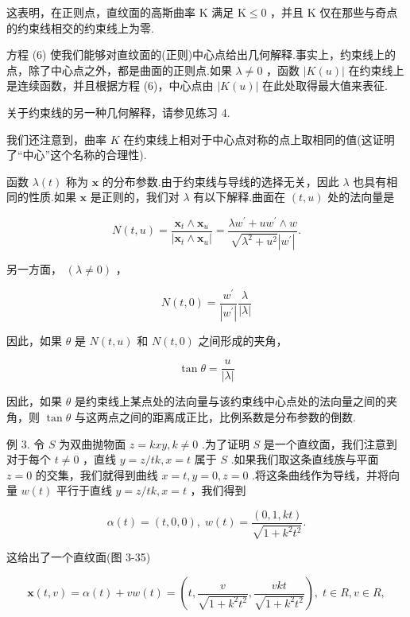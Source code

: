 这表明，在正则点，直纹面的高斯曲率 K 满足 \(\mathrm{K} \leq  0\) ，并且 \(\mathrm{K}\) 仅在那些与奇点的约束线相交的约束线上为零.

方程 (6) 使我们能够对直纹面的(正则)中心点给出几何解释.事实上，约束线上的点，除了中心点之外，都是曲面的正则点.如果 \(\lambda  \neq  0\) ，函数 \(\left| {K\left( u\right) }\right|\) 在约束线上是连续函数，并且根据方程 (6)，中心点由 \(\left| {K\left( u\right) }\right|\) 在此处取得最大值来表征.

关于约束线的另一种几何解释，请参见练习 4.

我们还注意到，曲率 \(K\) 在约束线上相对于中心点对称的点上取相同的值(这证明了“中心”这个名称的合理性).

函数 \(\lambda \left( t\right)\) 称为 \(\mathbf{x}\) 的分布参数.由于约束线与导线的选择无关，因此 \(\lambda\) 也具有相同的性质.如果 \(\mathbf{x}\) 是正则的，我们对 \(\lambda\) 有以下解释.曲面在 \(\left( {t,u}\right)\) 处的法向量是

\[
N\left( {t,u}\right)  = \frac{{\mathbf{x}}_{t} \land  {\mathbf{x}}_{u}}{\left| {\mathbf{x}}_{t} \land  {\mathbf{x}}_{u}\right| } = \frac{\lambda {w}^{\prime } + u{w}^{\prime } \land  w}{\sqrt{{\lambda }^{2} + {u}^{2}}\left| {w}^{\prime }\right| }.
\]

另一方面， \(\left( {\lambda  \neq  0}\right)\) ，

\[
N\left( {t,0}\right)  = \frac{{w}^{\prime }}{\left| {w}^{\prime }\right| }\frac{\lambda }{\left| \lambda \right| }
\]

因此，如果 \(\theta\) 是 \(N\left( {t,u}\right)\) 和 \(N\left( {t,0}\right)\) 之间形成的夹角，

\[
\tan \theta  = \frac{u}{\left| \lambda \right| } \tag{7}
\]

因此，如果 \(\theta\) 是约束线上某点处的法向量与该约束线中心点处的法向量之间的夹角，则 \(\tan \theta\) 与这两点之间的距离成正比，比例系数是分布参数的倒数.

例 3. 令 \(S\) 为双曲抛物面 \(z = {kxy},k \neq  0\) .为了证明 \(S\) 是一个直纹面，我们注意到对于每个 \(t \neq  0\) ，直线 \(y = z/{tk},x = t\) 属于 \(S\) .如果我们取这条直线族与平面 \(z = 0\) 的交集，我们就得到曲线 \(x = t,y = 0,z = 0\) .将这条曲线作为导线，并将向量 \(w\left( t\right)\) 平行于直线 \(y = z/{tk},x = t\) ，我们得到

\[
\alpha \left( t\right)  = \left( {t,0,0}\right) ,\;w\left( t\right)  = \frac{\left( 0,1,kt\right) }{\sqrt{1 + {k}^{2}{t}^{2}}}.
\]

这给出了一个直纹面(图 3-35)

\[
\mathbf{x}\left( {t,v}\right)  = \alpha \left( t\right)  + {vw}\left( t\right)  = \left( {t,\frac{v}{\sqrt{1 + {k}^{2}{t}^{2}}},\frac{vkt}{\sqrt{1 + {k}^{2}{t}^{2}}}}\right) ,\;t \in  R,v \in  R,
\]


